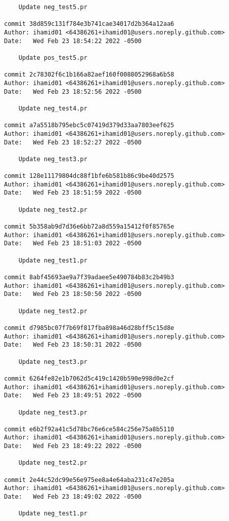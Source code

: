{\begin{verbatim}
    Update neg_test5.pr

commit 38d859c131f784e3b741cae34017d2b364a12aa6
Author: ihamid01 <64386261+ihamid01@users.noreply.github.com>
Date:   Wed Feb 23 18:54:22 2022 -0500

    Update pos_test5.pr

commit 2c78302f6c1b166a82aef160f0088052968a6b58
Author: ihamid01 <64386261+ihamid01@users.noreply.github.com>
Date:   Wed Feb 23 18:52:56 2022 -0500

    Update neg_test4.pr

commit a7a5518b795ebc5c07419d379d33aa7803eef625
Author: ihamid01 <64386261+ihamid01@users.noreply.github.com>
Date:   Wed Feb 23 18:52:27 2022 -0500

    Update neg_test3.pr

commit 128e11179804dc88f1bfe6b581b86c9be40d2575
Author: ihamid01 <64386261+ihamid01@users.noreply.github.com>
Date:   Wed Feb 23 18:51:59 2022 -0500

    Update neg_test2.pr

commit 5b358ab9d7d36e6bb72a8d559a15412f0f85765e
Author: ihamid01 <64386261+ihamid01@users.noreply.github.com>
Date:   Wed Feb 23 18:51:03 2022 -0500

    Update neg_test1.pr

commit 8abf45693ae9a7f39adaee5e490784b83c2b49b3
Author: ihamid01 <64386261+ihamid01@users.noreply.github.com>
Date:   Wed Feb 23 18:50:50 2022 -0500

    Update neg_test2.pr

commit d7985bc07f7b69f817fba898a46d28bff5c15d8e
Author: ihamid01 <64386261+ihamid01@users.noreply.github.com>
Date:   Wed Feb 23 18:50:31 2022 -0500

    Update neg_test3.pr

commit 6264fe82e1b7062d5c419c1420b590e998d0e2cf
Author: ihamid01 <64386261+ihamid01@users.noreply.github.com>
Date:   Wed Feb 23 18:49:51 2022 -0500

    Update neg_test3.pr

commit e6b2f92a41c5d78bc76e6ce584c256e75a8b5110
Author: ihamid01 <64386261+ihamid01@users.noreply.github.com>
Date:   Wed Feb 23 18:49:22 2022 -0500

    Update neg_test2.pr

commit 2e44c52dc99e56e975ee8a4e64aba231c47e205a
Author: ihamid01 <64386261+ihamid01@users.noreply.github.com>
Date:   Wed Feb 23 18:49:02 2022 -0500

    Update neg_test1.pr


\end{verbatim}}
